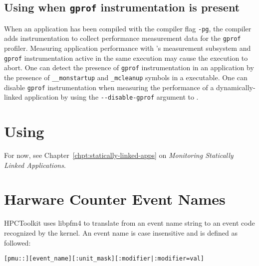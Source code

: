 \subsection{Using \hpcrun{} when {\tt gprof} instrumentation is present}

When an application has been compiled with the compiler flag \verb|-pg|,
the compiler adds instrumentation to collect performance measurement data for 
the \verb|gprof| profiler. Measuring application performance with 
\hpctoolkit{}'s measurement subsystem and \verb|gprof| instrumentation
active in the same execution may cause the execution
to abort. One can detect the presence of \verb|gprof| instrumentation in an
application by the presence of \verb|__monstartup| and \verb|_mcleanup| symbols 
in a executable.
One can disable \verb|gprof| instrumentation when measuring the performance of 
a dynamically-linked application by using the \verb|--disable-gprof| 
argument to \hpcrun{}.


\section{Using \hpclink{}}

For now, see Chapter~\ref{chpt:statically-linked-apps} on {\it
Monitoring Statically Linked Applications}.


\section{Harware Counter Event Names}

HPCToolkit uses libpfm4\cite{libpfm-www} to translate from an event name string to an event code recognized by the kernel. 
An event name is case insensitive and is defined as followed:
\begin{verbatim}
[pmu::][event_name][:unit_mask][:modifier|:modifier=val] 
\end{verbatim}

